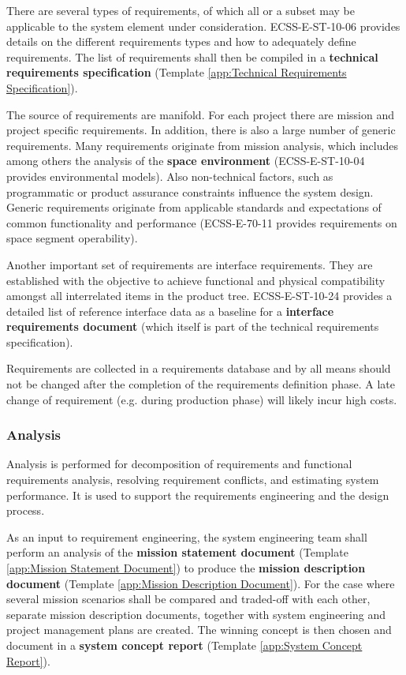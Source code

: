 There are several types of requirements, of which all or a subset may be applicable to the system element under consideration. ECSS-E-ST-10-06 \cite{ECSS-E-ST-10-06} provides details on the different requirements types and how to adequately define requirements. The list of requirements shall then be compiled in a \textbf{technical requirements specification} (Template \ref{app:Technical Requirements Specification}). 

The source of requirements are manifold. For each project there are mission and project specific requirements. In addition, there is also a large number of generic requirements. Many requirements originate from mission analysis, which includes among others the analysis of the \textbf{space environment} (ECSS-E-ST-10-04 \cite{ECSS-E-ST-10-04} provides environmental models). Also non-technical factors, such as programmatic or product assurance constraints influence the system design. Generic requirements originate from applicable standards and expectations of common functionality and performance (ECSS-E-70-11 \cite{ECSS-E-ST-70-11} provides requirements on space segment operability).

Another important set of requirements are interface requirements. They are established with the objective to achieve functional and physical compatibility amongst all interrelated items in the product tree. ECSS-E-ST-10-24 \cite{ECSS-E-ST-10-24} provides a detailed list of reference interface data as a baseline for a \textbf{interface requirements document} (which itself is part of the technical requirements specification). 

Requirements are collected in a requirements database and by all means should not be changed after the completion of the requirements definition phase. A late change of requirement (e.g. during production phase) will likely incur high costs.

\subsubsection{Analysis}

Analysis is performed for decomposition of requirements and functional requirements analysis, resolving requirement conflicts, and estimating system performance. It is used to support the requirements engineering and the design process.

As an input to requirement engineering, the system engineering team shall perform an analysis of the \textbf{mission statement document} (Template \ref{app:Mission Statement Document}) to produce the \textbf{mission description document} (Template \ref{app:Mission Description Document}). For the case where several mission scenarios shall be compared and traded-off with each other, separate mission description documents, together with system engineering and project management plans are created. The winning concept is then chosen and document in a \textbf{system concept report} (Template \ref{app:System Concept Report}).

